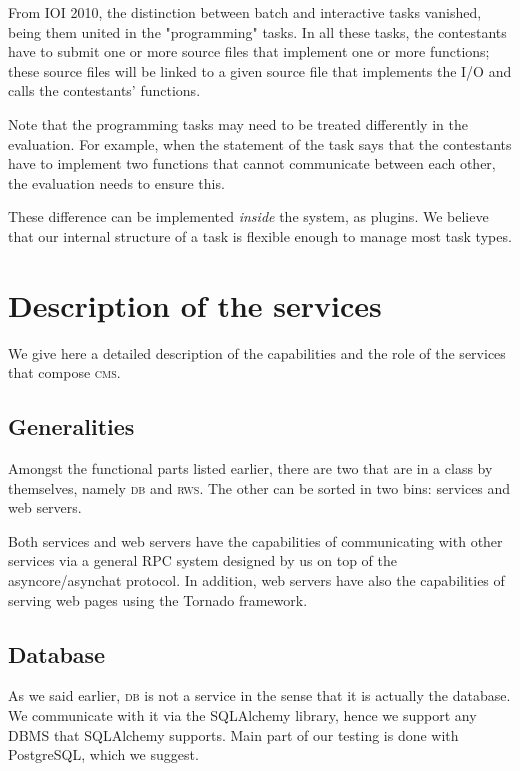 \documentclass[a4paper,8pt]{amsart}
\newcommand{\CMS}{\textsc{cms}}
\newcommand{\DB}{\textsc{db}}
\newcommand{\RWS}{\textsc{rws}}
\begin{document}
\begin{multicols}{2}
  From IOI 2010, the distinction between batch and interactive tasks
  vanished, being them united in the "programming" tasks. In all these
  tasks, the contestants have to submit one or more source files that
  implement one or more functions; these source files will be linked
  to a given source file that implements the I/O and calls the
  contestants' functions.

  Note that the programming tasks may need to be treated differently
  in the evaluation. For example, when the statement of the task says
  that the contestants have to implement two functions that cannot
  communicate between each other, the evaluation needs to ensure this.

  These difference can be implemented \emph{inside} the system, as
  plugins. We believe that our internal structure of a task is
  flexible enough to manage most task types.

  \section{Description of the services}

  We give here a detailed description of the capabilities and the role
  of the services that compose \CMS{}.

  \subsection{Generalities}

  Amongst the functional parts listed earlier, there are two that are
  in a class by themselves, namely \DB{} and \RWS{}. The other can be
  sorted in two bins: services and web servers.

  Both services and web servers have the capabilities of communicating
  with other services via a general RPC system designed by us on top
  of the asyncore/asynchat protocol. In addition, web servers have
  also the capabilities of serving web pages using the Tornado
  framework.

  \subsection{Database}

  As we said earlier, \DB{} is not a service in the sense that it is
  actually the database. We communicate with it via the SQLAlchemy
  library, hence we support any DBMS that SQLAlchemy supports. Main
  part of our testing is done with PostgreSQL, which we suggest.


\end{multicols}
\end{document}
